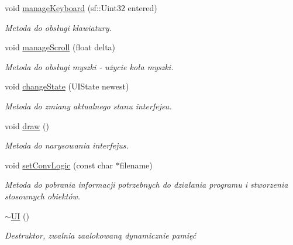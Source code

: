 \begin{DoxyCompactItemize}
void \mbox{\hyperlink{class_u_i_a30ed84234a73dff1092674459f36d6f4}{manage\+Keyboard}} (sf\+::\+Uint32 entered)
\begin{DoxyCompactList}\small\item\em Metoda do obsługi klawiatury. \end{DoxyCompactList}\item 
void \mbox{\hyperlink{class_u_i_a94799c22dde5791cc3428a307b5edd41}{manage\+Scroll}} (float delta)
\begin{DoxyCompactList}\small\item\em Metoda do obsługi myszki -\/ użycie koła myszki. \end{DoxyCompactList}\item 
void \mbox{\hyperlink{class_u_i_aaf58d768dcc0d9a2d55e87e1a02f853e}{change\+State}} (U\+I\+State newest)
\begin{DoxyCompactList}\small\item\em Metoda do zmiany aktualnego stanu interfejsu. \end{DoxyCompactList}\item 
\mbox{\label{class_u_i_a11a5b60d8f59c41b6d1acf9d153eaafa}} 
void \mbox{\hyperlink{class_u_i_a11a5b60d8f59c41b6d1acf9d153eaafa}{draw}} ()
\begin{DoxyCompactList}\small\item\em Metoda do narysowania interfejus. \end{DoxyCompactList}\item 
\mbox{\label{class_u_i_a0eddf861167228994af1f3fd1b663a54}} 
void \mbox{\hyperlink{class_u_i_a0eddf861167228994af1f3fd1b663a54}{set\+Conv\+Logic}} (const char $\ast$filename)
\begin{DoxyCompactList}\small\item\em Metoda do pobrania informacji potrzebnych do działania programu i stworzenia stosownych obiektów. \end{DoxyCompactList}\item 
\mbox{\label{class_u_i_a1b23d0c64c7cbb3d143d90ec532a7ccd}} 
\mbox{\hyperlink{class_u_i_a1b23d0c64c7cbb3d143d90ec532a7ccd}{$\sim$\+UI}} ()
\begin{DoxyCompactList}\small\item\em Destruktor, zwalnia zaalokowaną dynamicznie pamięć \end{DoxyCompactList}\end{DoxyCompactItemize}
